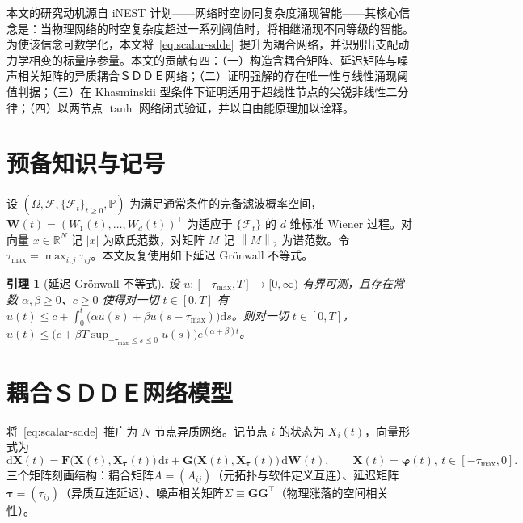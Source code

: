\documentclass[12pt,a4paper]{ctexart}
\newcommand{\kai}[1]{{\CJKfamily{kai}#1}}
\newtheorem{lemma}{引理}
\newcommand{\R}{\mathbb{R}}
\newcommand{\Prob}{\mathbb{P}}
\newcommand{\dd}{\mathrm{d}}
\newcommand{\norm}[1]{\left\lVert #1 \right\rVert}
\newcommand{\abs}[1]{\left\lvert #1 \right\rvert}
\newcommand{\X}{\mathbf{X}}
\newcommand{\W}{\mathbf{W}}
\newcommand{\F}{\mathbf{F}}
\newcommand{\G}{\mathbf{G}}
\begin{document}
\hspace{2em}本文的研究动机源自 iNEST 计划——\kai{网络时空协同复杂度涌现智能}——其核心信念是：当物理网络的时空复杂度超过一系列阈值时，将相继涌现不同等级的智能。为使该信念可数学化，本文将~\eqref{eq:scalar-sdde}~提升为耦合网络，并识别出支配动力学相变的标量序参量。本文的贡献有四：（一）构造含耦合矩阵、延迟矩阵与噪声相关矩阵的异质耦合ＳＤＤＥ网络；（二）证明强解的存在唯一性与线性涌现阈值判据；（三）在 Khasminskii 型条件下证明适用于超线性节点的尖锐非线性二分律；（四）以两节点 $\tanh$ 网络闭式验证，并以自由能原理加以诠释。

\section{预备知识与记号}\label{sec:prelim}

\hspace{2em}设 $(\Omega,\mathcal{F},\{\mathcal{F}_t\}_{t\ge0},\Prob)$ 为满足通常条件的完备滤波概率空间，$\W(t)=(W_1(t),\dots,W_d(t))^\top$ 为适应于 $\{\mathcal{F}_t\}$ 的 $d$ 维标准 Wiener 过程。对向量 $x\in\R^N$ 记 $\abs{x}$ 为欧氏范数，对矩阵 $M$ 记 $\norm{M}_2$ 为谱范数。令 $\tau_{\max}=\max_{i,j}\tau_{ij}$。本文反复使用如下延迟 Grönwall 不等式。

\begin{lemma}[延迟 Grönwall 不等式]\label{lem:gronwall}
设 $u:[-\tau_{\max},T]\to[0,\infty)$ 有界可测，且存在常数 $\alpha,\beta\ge0$、$c\ge0$ 使得对一切 $t\in[0,T]$ 有 $u(t)\le c+\int_0^t\bigl(\alpha u(s)+\beta u(s-\tau_{\max})\bigr)\dd s$。则对一切 $t\in[0,T]$，$u(t)\le\bigl(c+\beta T\sup_{-\tau_{\max}\le s\le0}u(s)\bigr)e^{(\alpha+\beta)t}$。
\end{lemma}

\section{耦合ＳＤＤＥ网络模型}\label{sec:model}

\hspace{2em}将~\eqref{eq:scalar-sdde}~推广为 $N$ 节点异质网络。记节点 $i$ 的状态为 $X_i(t)$，向量形式为
\begin{equation}\label{eq:vector-sdde}
\dd\X(t)=\F\bigl(\X(t),\X_{\bm{\tau}}(t)\bigr)\,\dd t+\G\bigl(\X(t),\X_{\bm{\tau}}(t)\bigr)\,\dd\W(t),\qquad\X(t)=\bm{\varphi}(t),\ t\in[-\tau_{\max},0].
\end{equation}
三个矩阵刻画结构：\kai{耦合矩阵}$A=(A_{ij})$（元拓扑与软件定义互连）、\kai{延迟矩阵}$\bm{\tau}=(\tau_{ij})$（异质互连延迟）、\kai{噪声相关矩阵}$\Sigma\equiv\G\G^\top$（物理涨落的空间相关性）。
\end{document}
